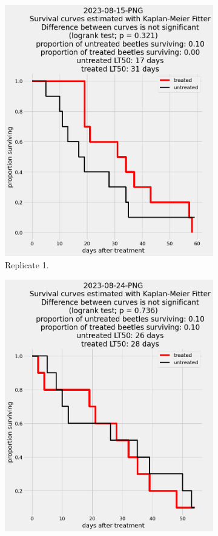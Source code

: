 \documentclass[12pt,letterpaper,english,bibliography=totocnumbered, abstract=on]{scrartcl}
\begin{document}
\begin{figure}[h]
	\centering
	\begin{subfigure}{.3\textwidth}
		\includegraphics[width=\linewidth]{images/survival_curves/2023-08-15-PNG}
		\caption{Replicate 1.}
	\end{subfigure}
	\begin{subfigure}{.3\textwidth}
		\includegraphics[width=\textwidth]{images/survival_curves/2023-08-24-PNG}

\end{subfigure}
\end{figure}
\end{document}
